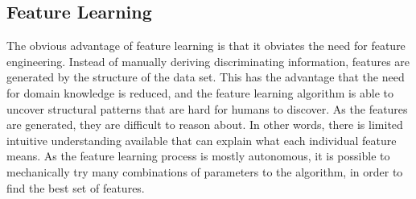 \subsection{Feature Learning}
The obvious advantage of feature learning is that it obviates the need for feature engineering. Instead of manually deriving discriminating information, features are generated by the structure of the data set. This has the advantage that the need for domain knowledge is reduced, and the feature learning algorithm is able to uncover structural patterns that are hard for humans to discover. As the features are generated, they are difficult to reason about. In other words, there is limited intuitive understanding available that can explain what each individual feature means. As the feature learning process is mostly autonomous, it is possible to mechanically try many combinations of parameters to the algorithm, in order to find the best set of features.


